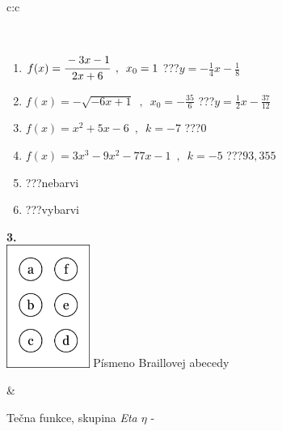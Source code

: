 \documentclass[10pt]{report}
\begin{document}
\begin{tabular}{c:c}
\begin{minipage}[c][104.5mm][t]{0.5\linewidth}
\begin{center}
\begin{minipage}{0.95\linewidth}
\begin{center}
\end{center}
\end{minipage}
\\[1mm]
\begin{minipage}{0.79\linewidth}
\begin{center}
\begin{varwidth}{\linewidth}
\begin{enumerate}
\small
\item $f(x)=\cfrac{-3x-1}{2x+6}\enspace , \enspace x_0=1$\quad \dotfill\; ???\;\dotfill \quad $y = -\frac{1}{4}x-\frac{1}{8}$
\item $f(x)=-\sqrt{-6x+1}\enspace , \enspace x_0=-\frac{35}{6}$\quad \dotfill\; ???\;\dotfill \quad $y = \frac{1}{2}x-\frac{37}{12}$
\item $f(x)=x^2+5x-6\enspace , \enspace k=-7$\quad \dotfill\; ???\;\dotfill \quad $0$
\item $f(x)=3x^3-9x^2-77x-1\enspace , \enspace k=-5$\quad \dotfill\; ???\;\dotfill \quad $93 , 355$
\item \quad \dotfill\; ???\;\dotfill \quad nebarvi
\item \quad \dotfill\; ???\;\dotfill \quad vybarvi
\end{enumerate}
\end{varwidth}
\end{center}
\end{minipage}
\begin{minipage}{0.20\linewidth}
\begin{center}
{\Huge\bfseries 3.} \\[2mm]
\includegraphics[height=40mm]{../images/braille.png}
{\small Písmeno Braillovej abecedy}
\end{center}
\end{minipage}
\end{center}
\end{minipage}
&
\begin{minipage}[c][104.5mm][t]{0.5\linewidth}
\begin{center}
\vspace{7mm}
{\huge Tečna funkce, skupina \textit{Eta $\eta$} -}\\[5mm]

\end{center}
\end{minipage}
\end{tabular}
\end{document}
